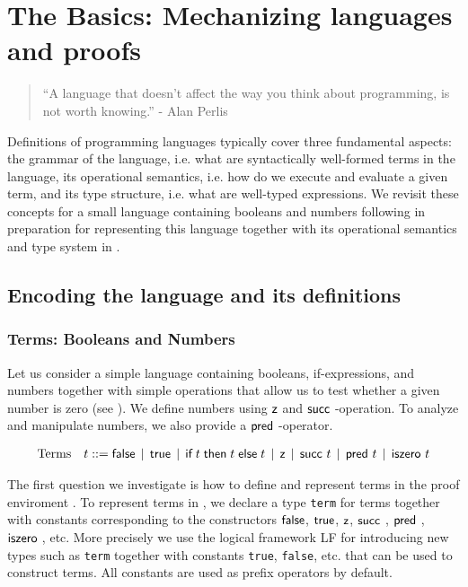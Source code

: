 \chapter{The Basics: Mechanizing languages and proofs}

\begin{quote}
``A language that doesn't affect the way you think about programming, is
not worth knowing.''
\hfill - Alan Perlis
\end{quote}

Definitions of programming languages  typically cover three fundamental aspects:
the grammar  of the language,  i.e. what are syntactically  well-formed terms in
the language,  its operational semantics,  i.e. how do we execute and evaluate a
given term,  and its  type structure, i.e. what are  well-typed expressions.  We
revisit  these concepts  for  a small language  containing booleans  and numbers
following \citep[Ch 3,Ch 8]{TAPL} in  preparation for representing this language
together with its operational semantics and type system in \beluga.

\section{Encoding the language and its definitions}

\subsection{Terms: Booleans and Numbers}

Let  us  consider  a simple language  containing booleans,  if-expressions,  and
numbers together  with simple operations  that allow us  to test whether a given
number is zero (see \cite[Ch 3, Fig 3-1,Fig 3-2]{TAPL}). We define numbers using
$\textsf{z}$ and $\tmsucc$-operation.  To analyze  and manipulate numbers,  we also
provide a $\tmpred$-operator.

\[
\begin{array}{ll@{\bnfas}l}
\mbox{Terms} & t & \tmfalse \bnfalt \tmtrue \bnfalt \tmif t t t \bnfalt
\tmzero \bnfalt \tmsucc t \bnfalt \tmpred t \bnfalt \tmiszero t
\end{array}
\]

The first question  we investigate is  how to define  and represent terms in the
proof  enviroment  \beluga. To represent  terms  in \beluga,  we declare  a type
\lstinline!term!  for  terms   together  with  constants  corresponding  to  the
constructors    $\textsf{false}$,   $\textsf{true}$,    $\textsf{z}$,   $\tmsucc$,   $\tmpred$,
$\tmiszero$,  etc.   More   precisely   we   use   the   logical   framework  LF
\citep{Harper93jacm} for introducing new types such as \lstinline!term! together
with constants  \lstinline!true!,  \lstinline!false!, etc.  that  can be used to
construct terms. All constants are used as prefix operators by default.

